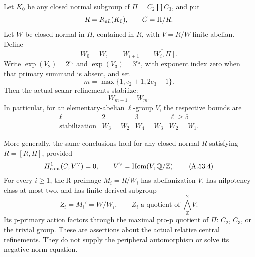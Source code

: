 Let \(K_0\) be any closed normal subgroup of
\(\Pi=C_2\amalg C_3\), and put
\[
 R=R_{\rm nil}(K_0),\qquad C=\Pi/R.
\]
Let \(W\) be closed normal in \(\Pi\), contained
in \(R\), with \(V=R/W\) finite abelian. Define
\[
 W_0=W,\qquad W_{i+1}=\overline{[W_i,\Pi]}.
\]
Write \(\exp(V_2)=2^{e_2}\) and
\(\exp(V_3)=3^{e_3}\), with exponent index zero
when that primary summand is absent, and set
\[
                     m=\max\{1,e_2+1,2e_3+1\}.
                                                               \tag{A.53.1}
\]
Then the actual scalar refinements stabilize:
\[
                            W_{m+1}=W_m.
                                                               \tag{A.53.2}
\]
In particular, for an elementary-abelian
\(\ell\)-group \(V\), the respective bounds are
\[
\begin{array}{c|ccc}
 \ell&2&3&\ell\geq5\\ \hline
 \text{stabilization}&W_3=W_2&W_4=W_3&W_2=W_1.
\end{array}                                                   \tag{A.53.3}
\]

More generally, the same conclusions hold for
any closed normal \(R\) satisfying
\(R=\overline{[R,\Pi]}\), provided
\[
 H^1_{\rm cont}(C,V^\vee)=0,
 \qquad V^\vee=\operatorname{Hom}(V,\mathbb Q/\mathbb Z).
                                                               \tag{A.53.4}
\]
For every \(i\geq1\), the R-preimage
\(M_i=R/W_i\) has abelianization \(V\), has
nilpotency class at most two, and has finite
derived subgroup
\[
 Z_i=M_i'=W/W_i,
 \qquad Z_i\text{ a quotient of }
                 \textstyle\bigwedge^2_{\mathbb Z}V.
                                                               \tag{A.53.5}
\]
Its p-primary action factors through the maximal
pro-p quotient of \(\Pi\): \(C_2\), \(C_3\),
or the trivial group. These are assertions about
the actual relative central refinements.
They do not supply the peripheral automorphism
or solve its negative norm equation.

